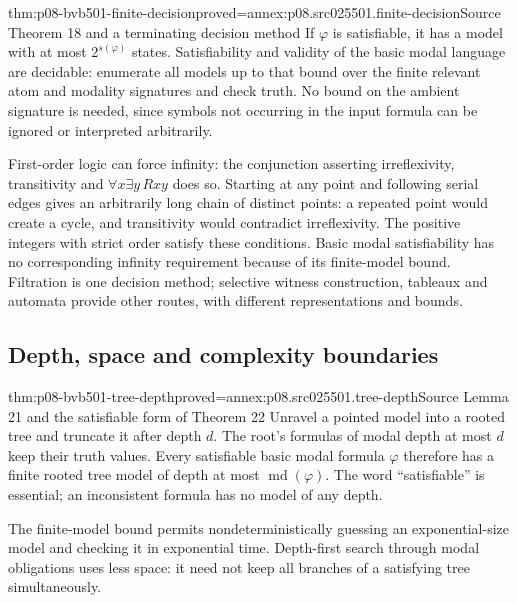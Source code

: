 \begin{hbcorollary}{thm:p08-bvb501-finite-decision}{proved=annex:p08.src025501.finite-decision}{Source Theorem 18 and a terminating decision method}
If \(\varphi\) is satisfiable, it has a model with at most
\(2^{s(\varphi)}\) states. Satisfiability and validity of the basic
modal language are decidable: enumerate all models up to that bound
over the finite relevant atom and modality signatures and check truth.
No bound on the ambient signature is needed, since symbols not occurring
in the input formula can be ignored or interpreted arbitrarily.
\end{hbcorollary}

First-order logic can force infinity: the conjunction asserting
irreflexivity, transitivity and \(\forall x\exists y\,Rxy\)
does so. Starting at any point and following serial edges gives an
arbitrarily long chain of distinct points: a repeated point would create
a cycle, and transitivity would contradict irreflexivity. The positive
integers with strict order satisfy these conditions. Basic modal
satisfiability has no corresponding infinity requirement because of its
finite-model bound. Filtration is one decision method; selective witness
construction, tableaux and automata provide other routes, with different
representations and bounds.

\subsection{Depth, space and complexity boundaries}
\label{sec:p08-bvb501-complexity}

\begin{hbtheorem}{thm:p08-bvb501-tree-depth}{proved=annex:p08.src025501.tree-depth}{Source Lemma 21 and the satisfiable form of Theorem 22}
Unravel a pointed model into a rooted tree and truncate it after depth
\(d\). The root's formulas of modal depth at most \(d\) keep their
truth values. Every satisfiable basic modal formula \(\varphi\)
therefore has a finite rooted tree model of depth at most
\(\operatorname{md}(\varphi)\). The word ``satisfiable'' is essential;
an inconsistent formula has no model of any depth.
\end{hbtheorem}

The finite-model bound permits nondeterministically guessing an
exponential-size model and checking it in exponential time. Depth-first
search through modal obligations uses less space: it need not keep all
branches of a satisfying tree simultaneously.

